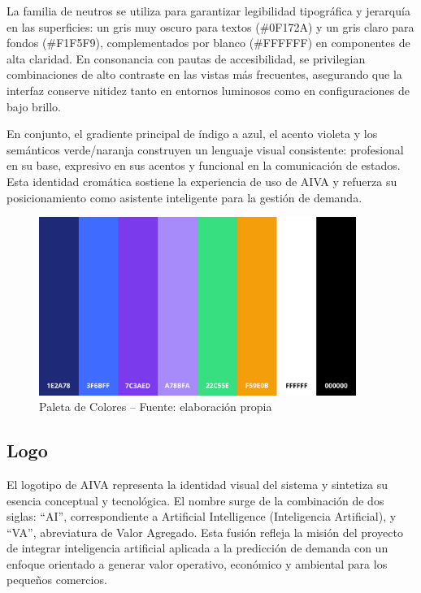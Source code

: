 La familia de neutros se utiliza para garantizar legibilidad tipográfica y jerarquía en las superficies: un gris muy oscuro para textos (\#0F172A) y un gris claro para fondos (\#F1F5F9), complementados por blanco (\#FFFFFF) en componentes de alta claridad. En consonancia con pautas de accesibilidad, se privilegian combinaciones de alto contraste en las vistas más frecuentes, asegurando que la interfaz conserve nitidez tanto en entornos luminosos como en configuraciones de bajo brillo.

En conjunto, el gradiente principal de índigo a azul, el acento violeta y los semánticos verde/naranja construyen un lenguaje visual consistente: profesional en su base, expresivo en sus acentos y funcional en la comunicación de estados. Esta identidad cromática sostiene la experiencia de uso de AIVA y refuerza su posicionamiento como asistente inteligente para la gestión de demanda.

\begin{figure}[!htbp]
  \centering
  \includegraphics[width=0.92\textwidth]{images/paleta-aiva.png}
  \caption{Paleta de Colores -- Fuente: elaboración propia}
  \label{fig:paleta-aiva}
\end{figure}

\subsection{Logo}
El logotipo de AIVA representa la identidad visual del sistema y sintetiza su esencia conceptual y tecnológica. El nombre surge de la combinación de dos siglas: “AI”, correspondiente a Artificial Intelligence (Inteligencia Artificial), y “VA”, abreviatura de Valor Agregado. Esta fusión refleja la misión del proyecto de integrar inteligencia artificial aplicada a la predicción de demanda con un enfoque orientado a generar valor operativo, económico y ambiental para los pequeños comercios.

